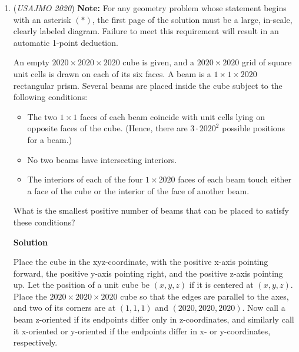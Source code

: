 \begin{enumerate}
 Let $t=e^{i\theta}$, and we know that $\theta\in\left(\frac{2\pi}{3},\frac{4\pi}{3}\right)$.

 We construct the circumcircle of $\triangle ABC$ and circle $\Gamma$ with radius $4$ and is concentric with $\omega$. Let $X, Y$ be the intersection of the perpendicular bisector of $BC,CA$ with $\Gamma$. We conclude that the possible locations of $R$ is the arc $\overset{\frown}{AB}$ (excluding the endpoints) and the arc $\overset{\frown}{XY}$ (excluding the endpoints).

 


	\item (\textit{USAJMO 2020}) \textbf{Note:} For any geometry problem whose statement begins with an asterisk $(*)$, the first page of the solution must be a large, in-scale, clearly labeled diagram. Failure to meet this requirement will result in an automatic 1-point deduction.


 An empty $2020 \times 2020 \times 2020$ cube is given, and a $2020 \times 2020$ grid of square unit cells is drawn  on each of its six faces. A beam is a $1 \times 1 \times 2020$ rectangular prism. Several beams are placed inside the cube subject to the following conditions:


 
            \begin{itemize}
        \item The two $1 \times 1$ faces of each beam coincide with unit cells lying on opposite faces of the cube. (Hence, there are $3 \cdot {2020}^2$ possible positions for a beam.)

        \item No two beams have intersecting interiors.

        \item The interiors of each of the four $1 \times 2020$ faces of each beam touch either a face of the cube or the interior of the face of another beam.
            \end{itemize}
            What is the smallest positive number of beams that can be placed to satisfy these conditions?


 



\textbf{Solution}

Place the cube in the xyz-coordinate, with the positive x-axis pointing forward, the positive y-axis pointing right, and the positive z-axis pointing up. Let the position of a unit cube be $(x, y, z)$ if it is centered at $(x, y, z)$. Place the $2020 \times 2020 \times 2020$ cube so that the edges are parallel to the axes, and two of its corners are at $(1, 1, 1)$ and $(2020, 2020, 2020)$. Now call a beam z-oriented if its endpoints differ only in z-coordinates, and similarly call it x-oriented or y-oriented if the endpoints differ in x- or y-coordinates, respectively.


\end{enumerate}

